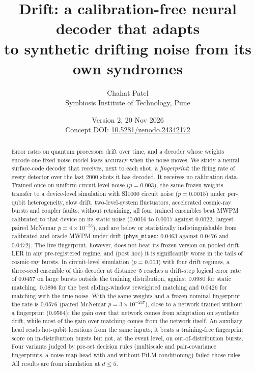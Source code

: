 \documentclass[11pt,a4paper]{article}
\title{\bfseries Drift: a calibration-free neural decoder that adapts\\to synthetic drifting noise from its own syndromes}
\author{Chahat Patel\\[2pt]\small Symbiosis Institute of Technology, Pune}
\date{\small Version 2, 20 Nov 2026\\[2pt]
\small Concept DOI: \href{https://doi.org/10.5281/zenodo.24342172}{10.5281/zenodo.24342172}}
\newcommand{\reg}[1]{\texttt{#1}}
\newcommand{\Eb}[2]{{#1}{\times}10^{-#2}}   %
\begin{document}
\maketitle

\begin{abstract}
\noindent
Error rates on quantum processors drift over time, and a decoder whose weights encode one fixed noise model
loses accuracy when the noise moves. We study a neural surface-code decoder that receives, next to each shot,
a \emph{fingerprint}: the firing rate of every detector over the last 2000 shots it has decoded. It receives no
calibration data. Trained once on uniform circuit-level noise ($p=0.003$), the same frozen weights transfer to
a device-level simulation with SI1000 circuit noise ($p=0.0015$) under per-qubit heterogeneity, slow drift,
two-level-system fluctuators, accelerated cosmic-ray bursts and coupler faults: without retraining, all four
trained ensembles beat MWPM calibrated to that device on its static noise (0.0016 to 0.0017 against 0.0022,
largest paired McNemar $p=\Eb{4}{56}$), and are below or statistically indistinguishable from
calibrated and oracle MWPM under drift
(\reg{phys\_mixed}: 0.0463 against 0.0476 and 0.0472). The live fingerprint, however, does not beat its
frozen version on pooled drift LER in any pre-registered regime, and (post hoc) it is
significantly worse in the tails of cosmic-ray bursts. In circuit-level simulation ($p=0.003$) with four
drift regimes, a three-seed ensemble of
this decoder at distance~5 reaches a drift-step logical error rate of 0.0457 on large bursts outside the
training distribution, against 0.0980 for static matching, 0.0896 for the best sliding-window reweighted
matching and 0.0426
for matching with the true noise. With the same weights and a frozen nominal fingerprint the rate is 0.0576 (paired
McNemar $p=\Eb{3}{247}$), close to a network trained without a fingerprint (0.0564): the gain over that network
comes from adaptation on synthetic drift, while most of the gain over matching comes from the network itself. An auxiliary head reads
hot-qubit locations from the same inputs; it beats a training-free fingerprint score on in-distribution bursts but
not, at the event level, on out-of-distribution bursts. Four variants judged by pre-set decision rules (multiscale and
pair-covariance fingerprints, a noise-map head with and without FiLM conditioning) failed those rules. All results
are from simulation at
$d\le5$.
\end{abstract}

\end{document}
